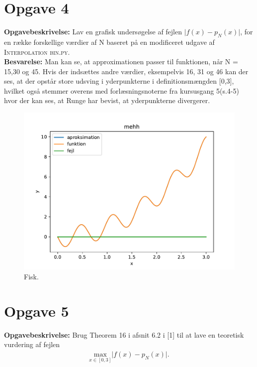 \section*{Opgave 4}
\textbf{Opgavebeskrivelse:} Lav en grafisk undersøgelse af fejlen $\lvert f(x)-p_N(x) \rvert$, for en række forskellige værdier af N baseret på en modificeret udgave af \textsc{Interpolation bin.py.}
\\
\textbf{Besvarelse:} Man kan se, at approximationen passer til funktionen, når N = 15,30 og 45. Hvis der indsættes andre værdier, eksempelvis 16, 31 og 46 kan der ses, at der opstår store udsving i yderpunkterne i definitionsmængden [0,3], hvilket også stemmer overens med forlæsningsnoterne fra kursusgang 5(s.4-5) hvor der kan ses, at Runge har bevist, at yderpunkterne divergerer.
%
\begin{figure}[h!]
\begin{center}
\includegraphics[scale=0.9]{code/del2}
\end{center}
\caption{Fisk.}
%
\end{figure} 
\section*{Opgave 5}
\textbf{Opgavebeskrivelse:} Brug Theorem 16 i afsnit 6.2 i [1] til at lave en teoretisk vurdering af fejlen
\begin{align*}
\underset{x \in \left [0,3 \right ]}{\text{max}} \lvert f(x)-p_N(x) \rvert.
\end{align*}


